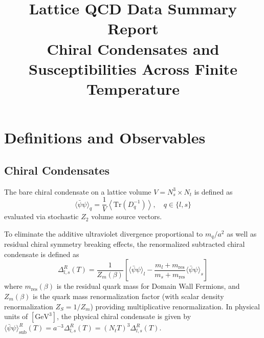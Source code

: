 \documentclass[11pt,a4paper]{article}
\title{\vspace{-1.0cm}
    \LARGE \textbf{\textcolor{themeblue}{Lattice QCD Data Summary Report}} \\
    \vspace{0.3cm}
    \large \textbf{Chiral Condensates and Susceptibilities Across Finite Temperature}
}
\author{}
\date{}
\begin{document}
\maketitle
\thispagestyle{fancy}

\vspace{0.2cm}

\section{Definitions and Observables}

\subsection{Chiral Condensates}
The bare chiral condensate on a lattice volume $V = N_s^3 \times N_t$ is defined as
\begin{equation}
\langle \bar{\psi}\psi \rangle_q = \frac{1}{V} \left\langle \text{Tr}\left( D_q^{-1} \right) \right\rangle, \quad q \in \{l, s\}
\end{equation}
evaluated via stochastic $Z_2$ volume source vectors.

To eliminate the additive ultraviolet divergence proportional to $m_q / a^2$ as well as residual chiral symmetry breaking effects, the renormalized subtracted chiral condensate is defined as
\begin{equation}
\Delta_{l, s}^R(T) = \frac{1}{Z_m(\beta)} \left[ \langle\bar{\psi}\psi\rangle_l - \frac{m_l + m_{\text{res}}}{m_s + m_{\text{res}}} \langle\bar{\psi}\psi\rangle_s \right]
\label{eq:delta_ls}
\end{equation}
where $m_{\text{res}}(\beta)$ is the residual quark mass for Domain Wall Fermions, and $Z_m(\beta)$ is the quark mass renormalization factor (with scalar density renormalization $Z_S = 1/Z_m$) providing multiplicative renormalization. In physical units of $[\text{GeV}^3]$, the physical chiral condensate is given by $\langle\bar{\psi}\psi\rangle_{\text{sub}}^R(T) = a^{-3} \Delta_{l, s}^R(T) = (N_t T)^3 \Delta_{l, s}^R(T)$.
\end{document}
